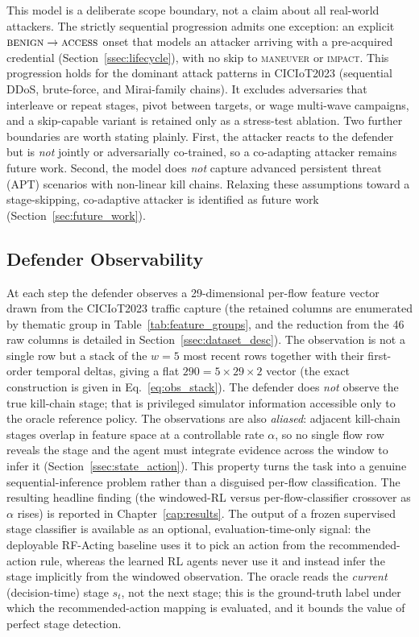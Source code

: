 This model is a deliberate scope boundary, not a claim about all real-world attackers. The strictly sequential progression admits one exception: an explicit $\textsc{benign}\to\textsc{access}$ onset that models an attacker arriving with a pre-acquired credential (Section~\ref{ssec:lifecycle}), with no skip to \textsc{maneuver} or \textsc{impact}. This progression holds for the dominant attack patterns in CICIoT2023 (sequential DDoS, brute-force, and Mirai-family chains). It excludes adversaries that interleave or repeat stages, pivot between targets, or wage multi-wave campaigns, and a skip-capable variant is retained only as a stress-test ablation. Two further boundaries are worth stating plainly. First, the attacker reacts to the defender but is \emph{not} jointly or adversarially co-trained, so a co-adapting attacker remains future work. Second, the model does \emph{not} capture advanced persistent threat (APT) scenarios with non-linear kill chains. Relaxing these assumptions toward a stage-skipping, co-adaptive attacker is identified as future work (Section~\ref{sec:future_work}).

\subsection{Defender Observability}
At each step the defender observes a 29-dimensional per-flow feature vector drawn from the CICIoT2023 traffic capture (the retained columns are enumerated by thematic group in Table~\ref{tab:feature_groups}, and the reduction from the 46 raw columns is detailed in Section~\ref{ssec:dataset_desc}). The observation is not a single row but a stack of the $w = 5$ most recent rows together with their first-order temporal deltas, giving a flat $290 = 5 \times 29 \times 2$ vector (the exact construction is given in Eq.~\eqref{eq:obs_stack}). The defender does \emph{not} observe the true kill-chain stage; that is privileged simulator information accessible only to the oracle reference policy. The observations are also \emph{aliased}: adjacent kill-chain stages overlap in feature space at a controllable rate $\alpha$, so no single flow row reveals the stage and the agent must integrate evidence across the window to infer it (Section~\ref{ssec:state_action}). This property turns the task into a genuine sequential-inference problem rather than a disguised per-flow classification. The resulting headline finding (the windowed-RL versus per-flow-classifier crossover as $\alpha$ rises) is reported in Chapter~\ref{cap:results}. The output of a frozen supervised stage classifier is available as an optional, evaluation-time-only signal: the deployable RF-Acting baseline uses it to pick an action from the recommended-action rule, whereas the learned RL agents never use it and instead infer the stage implicitly from the windowed observation. The oracle reads the \emph{current} (decision-time) stage $s_t$, not the next stage; this is the ground-truth label under which the recommended-action mapping is evaluated, and it bounds the value of perfect stage detection.

